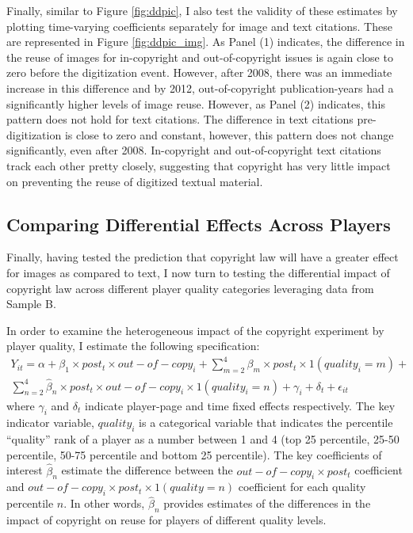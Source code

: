 \documentclass[11pt]{article}
\begin{document}
Finally, similar to Figure \ref{fig:ddpic}, I also test the validity of these estimates by plotting time-varying coefficients separately for image and text citations. These are represented in Figure \ref{fig:ddpic_img}. As Panel (1) indicates, the difference in the reuse of images for in-copyright and out-of-copyright issues is again close to zero before the digitization event. However, after 2008, there was an immediate increase in this difference and by 2012, out-of-copyright publication-years had a significantly higher levels of image reuse. However, as Panel (2) indicates, this pattern does not hold for text citations. The difference in text citations pre-digitization is close to zero and constant, however, this pattern does not change significantly, even after 2008. In-copyright and out-of-copyright text citations track each other pretty closely, suggesting that copyright has very little impact on preventing the reuse of digitized textual material.


\subsection{Comparing Differential Effects Across Players}
\label{sec:diff2}


Finally, having tested the prediction that copyright law will have a greater effect for images as compared to text, I now turn to testing the differential impact of copyright law across different player quality categories leveraging data from Sample B. 

In order to examine the heterogeneous impact of the copyright experiment by player quality, I estimate the following specification:
\begin{align*}
Y_{it} = \alpha + \beta_1 \times post_t \times out-of-copy_i + \sum\limits_{m=2}^4 \beta_m \times post_t \times 1(quality_i=m) + \\ \sum\limits_{n=2}^4 \hat{\beta}_n \times post_t \times out-of-copy_i \times 1(quality_i=n) + \gamma_i+ \delta_t + \epsilon_{it}
\end{align*}
where $\gamma_i$ and $\delta_t$ indicate player-page and time fixed effects respectively. The key indicator variable, $quality_i$ is a categorical variable that indicates the percentile ``quality'' rank of a player as a number between 1 and 4 (top 25 percentile, 25-50 percentile, 50-75 percentile and bottom 25 percentile). The key coefficients of interest $\hat{\beta}_n$ estimate the difference between the $out-of-copy_i \times post_t$ coefficient and $out-of-copy_i \times post_t \times 1(quality=n)$ coefficient for each quality percentile $n$. In other words, $\hat{\beta}_n$ provides estimates of the differences in the impact of copyright on reuse for players of different quality levels. 
\end{document}
